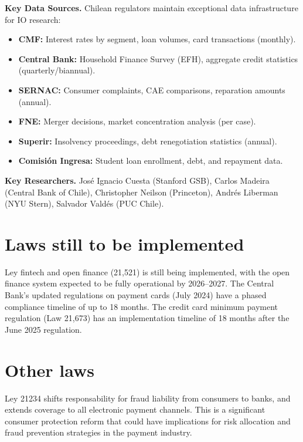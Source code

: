 \documentclass[12pt]{article}
\theoremstyle{plain}
\theoremstyle{plain}
\theoremstyle{definition}  %
\theoremstyle{remark}  %
\begin{document}
\medskip
\noindent \textbf{Key Data Sources.} Chilean regulators maintain exceptional data infrastructure for IO research:
\begin{itemize}
    \item \textbf{CMF:} Interest rates by segment, loan volumes, card transactions (monthly).
    \item \textbf{Central Bank:} Household Finance Survey (EFH), aggregate credit statistics (quarterly/biannual).
    \item \textbf{SERNAC:} Consumer complaints, CAE comparisons, reparation amounts (annual).
    \item \textbf{FNE:} Merger decisions, market concentration analysis (per case).
    \item \textbf{Superir:} Insolvency proceedings, debt renegotiation statistics (annual).
    \item \textbf{Comisi\'{o}n Ingresa:} Student loan enrollment, debt, and repayment data.
\end{itemize}

\noindent \textbf{Key Researchers.} Jos\'{e} Ignacio Cuesta (Stanford GSB), Carlos Madeira (Central Bank of Chile), Christopher Neilson (Princeton), Andr\'{e}s Liberman (NYU Stern), Salvador Vald\'{e}s (PUC Chile).


\section{Laws still to be implemented}

Ley fintech and open finance (21,521) is still being implemented, with the open finance system expected to be fully operational by 2026--2027. The Central Bank's updated regulations on payment cards (July 2024) have a phased compliance timeline of up to 18 months. The credit card minimum payment regulation (Law 21,673) has an implementation timeline of 18 months after the June 2025 regulation.

\newpage 
 








\section{Other laws}


Ley 21234 shifts responsability for fraud liability from consumers to banks, and extends coverage to all electronic payment channels. This is a significant consumer protection reform that could have implications for risk allocation and fraud prevention strategies in the payment industry.
\end{document}
